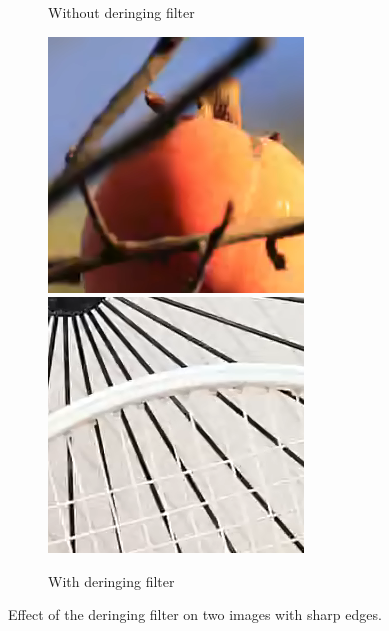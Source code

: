 \documentclass[english,conference,10pt]{IEEEtran}
\begin{document}
\begin{figure}
\begin{subfigure}[t]{0.5\columnwidth}
\caption{Without deringing filter}
\end{subfigure}\begin{subfigure}[t]{0.5\columnwidth}
\includegraphics[width=\columnwidth]{fruits_dering_crop}
\includegraphics[width=\columnwidth]{bike_dering_crop}
\caption{With deringing filter}
\end{subfigure}
\caption{Effect of the deringing filter on two images with sharp edges.\label{fig:deringing}}
\end{figure}
\end{document}
